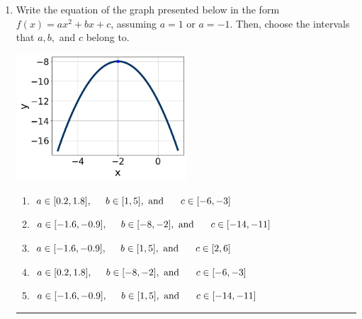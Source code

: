 \documentclass[14pt]{extbook}
\newcommand{\litem}[1]{\item#1\hspace*{-1cm}\rule{\textwidth}{0.4pt}}
\begin{document}
\begin{enumerate}
{\begin{enumerate}[label=\Alph*.]
\end{enumerate} }
\litem{
Write the equation of the graph presented below in the form $f(x)=ax^2+bx+c$, assuming  $a=1$ or $a=-1$. Then, choose the intervals that $a, b,$ and $c$ belong to.
\begin{center}
    \includegraphics[width=0.5\textwidth]{../Figures/quadraticGraphToEquationCopyB.png}
\end{center}
\begin{enumerate}[label=\Alph*.]
\item \( a \in [0.2, 1.8], \hspace*{5mm} b \in [1, 5], \text{ and } \hspace*{5mm} c \in [-6, -3] \)
\item \( a \in [-1.6, -0.9], \hspace*{5mm} b \in [-8, -2], \text{ and } \hspace*{5mm} c \in [-14, -11] \)
\item \( a \in [-1.6, -0.9], \hspace*{5mm} b \in [1, 5], \text{ and } \hspace*{5mm} c \in [2, 6] \)
\item \( a \in [0.2, 1.8], \hspace*{5mm} b \in [-8, -2], \text{ and } \hspace*{5mm} c \in [-6, -3] \)
\item \( a \in [-1.6, -0.9], \hspace*{5mm} b \in [1, 5], \text{ and } \hspace*{5mm} c \in [-14, -11] \)


\end{enumerate}}
\end{enumerate}
\end{document}
